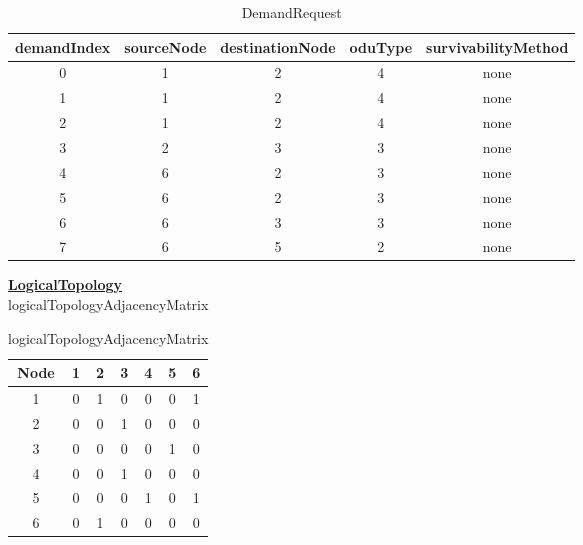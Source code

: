 \begin{table}[H]
	\centering
	\begin{tabular}{| c | c | c | c | c |}
		\hline
		\textbf{demandIndex} & \textbf{sourceNode} & \textbf{destinationNode} & \textbf{oduType} & \textbf{survivabilityMethod}\\ \hline
		0                    & 1                   & 2                        & 4                & none						   \\ \hline
		1                    & 1                   & 2                        & 4                & none                        \\ \hline
		2                    & 1                   & 2                        & 4                & none                        \\ \hline
		3                    & 2                   & 3                        & 3                & none                        \\ \hline
		4                    & 6                   & 2                        & 3                & none                        \\ \hline
		5                    & 6                   & 2                        & 3                & none                        \\ \hline
		6                    & 6                   & 3                        & 3                & none                        \\ \hline
		7                    & 6                   & 5                        & 2                & none                        \\ \hline
	\end{tabular}
	\caption{DemandRequest}
	\label{demand_request}
\end{table}

\underline{\textbf{LogicalTopology}}\\

logicalTopologyAdjacencyMatrix

\begin{table}[H]
	\centering
	\begin{tabular}{| c | c | c | c | c | c | c |}
		\hline
		\textbf{Node} & 1 & 2 & 3 & 4 & 5 & 6 \\ \hline
		1             & 0 & 1 & 0 & 0 & 0 & 1 \\ \hline
		2             & 0 & 0 & 1 & 0 & 0 & 0 \\ \hline
		3             & 0 & 0 & 0 & 0 & 1 & 0 \\ \hline
		4			  & 0 & 0 & 1 & 0 & 0 & 0 \\ \hline	
		5    	      & 0 & 0 & 0 & 1 & 0 & 1 \\ \hline
		6			  & 0 & 1 & 0 & 0 & 0 & 0 \\ \hline
	\end{tabular}
	\caption{logicalTopologyAdjacencyMatrix}
	\label{logical_matrix}
\end{table}


